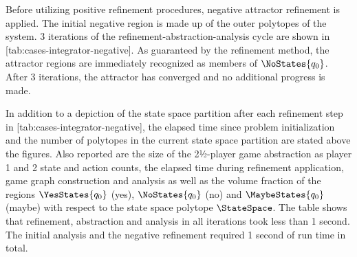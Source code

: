 
    Before utilizing positive refinement procedures, negative attractor refinement is applied.
    The initial negative region is made up of the outer polytopes of the system.
    3 iterations of the refinement-abstraction-analysis cycle are shown in [tab:cases-integrator-negative].
    As guaranteed by the refinement method, the attractor regions are immediately recognized as members of $\NoStates{q_0}$.
    After 3 iterations, the attractor has converged and no additional progress is made.

    In addition to a depiction of the state space partition after each refinement step in [tab:cases-integrator-negative], the elapsed time since problem initialization and the number of polytopes in the current state space partition are stated above the figures.
    Also reported are the size of the 2½-player game abstraction as player 1 and 2 state and action counts, the elapsed time during refinement application, game graph construction and analysis as well as the volume fraction of the regions $\YesStates{q_0}$ (yes), $\NoStates{q_0}$ (no) and $\MaybeStates{q_0}$ (maybe) with respect to the state space polytope $\StateSpace$.
    The table shows that refinement, abstraction and analysis in all iterations took less than 1 second.
    The initial analysis and the negative refinement required 1 second of run time in total.

